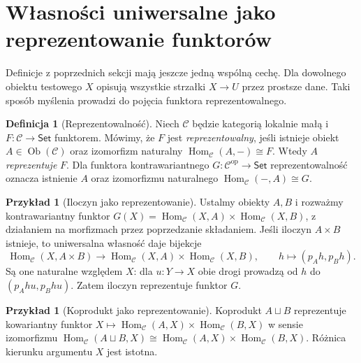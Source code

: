 \documentclass[11pt,a4paper]{article}
\numberwithin{equation}{section}
\theoremstyle{plain}
\theoremstyle{definition}
\newtheorem{definicja}[twierdzenie]{Definicja}
\newtheorem{przyklad}[twierdzenie]{Przykład}
\theoremstyle{remark}
\newcommand{\cat}[1]{\mathsf{#1}}
\newcommand{\Set}{\cat{Set}}
\newcommand{\Hom}{\operatorname{Hom}}
\newcommand{\Ob}{\operatorname{Ob}}
\newcommand{\op}{\mathrm{op}}
\begin{document}
\section{Własności uniwersalne jako reprezentowanie funktorów}\label{sec:reprezentacja}

Definicje z poprzednich sekcji mają jeszcze jedną wspólną cechę. Dla dowolnego obiektu testowego $X$ opisują wszystkie strzałki $X\to U$ przez prostsze dane. Taki sposób myślenia prowadzi do pojęcia funktora reprezentowalnego.

\begin{definicja}[Reprezentowalność]\label{def:representable}
Niech $\mathcal C$ będzie kategorią lokalnie małą i $F:\mathcal C\to\Set$ funktorem. Mówimy, że $F$ jest \emph{reprezentowalny}, jeśli istnieje obiekt $A\in\Ob(\mathcal C)$ oraz izomorfizm naturalny $\Hom_{\mathcal C}(A,-)\cong F$. Wtedy $A$ \emph{reprezentuje} $F$. Dla funktora kontrawariantnego $G:\mathcal C^{\op}\to\Set$ reprezentowalność oznacza istnienie $A$ oraz izomorfizmu naturalnego $\Hom_{\mathcal C}(-,A)\cong G$.
\end{definicja}

\begin{przyklad}[Iloczyn jako reprezentowanie]
Ustalmy obiekty $A,B$ i rozważmy kontrawariantny funktor $G(X)=\Hom_{\mathcal C}(X,A)\times\Hom_{\mathcal C}(X,B)$, z działaniem na morfizmach przez poprzedzanie składaniem. Jeśli iloczyn $A\times B$ istnieje, to uniwersalna własność daje bijekcje
\[
\Hom_{\mathcal C}(X,A\times B)\longrightarrow\Hom_{\mathcal C}(X,A)\times\Hom_{\mathcal C}(X,B),\qquad h\longmapsto(p_Ah,p_Bh).
\]
Są one naturalne względem $X$: dla $u:Y\to X$ obie drogi prowadzą od $h$ do $(p_Ahu,p_Bhu)$. Zatem iloczyn reprezentuje funktor $G$.
\end{przyklad}

\begin{przyklad}[Koprodukt jako reprezentowanie]
Koprodukt $A\sqcup B$ reprezentuje kowariantny funktor $X\mapsto\Hom_{\mathcal C}(A,X)\times\Hom_{\mathcal C}(B,X)$ w sensie izomorfizmu $\Hom_{\mathcal C}(A\sqcup B,X)\cong\Hom_{\mathcal C}(A,X)\times\Hom_{\mathcal C}(B,X)$. Różnica kierunku argumentu $X$ jest istotna.
\end{przyklad}
\end{document}
